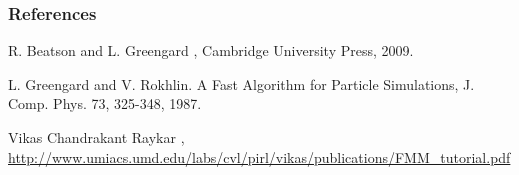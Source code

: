 \documentclass[mathserif,notes]{beamer}
\begin{document}
\begin{frame}[allowframebreaks]
  \frametitle<presentation>{References}    
  \begin{thebibliography}{10}    

 \beamertemplatebookbibitems
 R. Beatson and L. Greengard
    ,
   \newblock Cambridge University Press, 2009.

 \beamertemplatearticlebibitems
L. Greengard and V. Rokhlin.
  \newblock A Fast Algorithm for Particle Simulations,
 \newblock J. Comp. Phys. 73, 325-348, 1987.
 
\beamertemplateonlinebibitems
 Vikas Chandrakant Raykar
    ,
   \newblock \url{http://www.umiacs.umd.edu/labs/cvl/pirl/vikas/publications/FMM_tutorial.pdf}

 \end{thebibliography}
 \end{frame}
 
\end{document}

